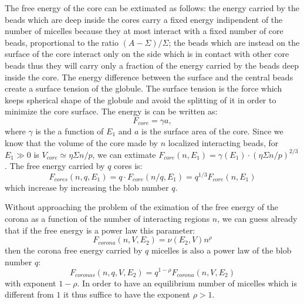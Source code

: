 \documentclass[12pt,a4paper,notitlepage]{article}
\begin{document}
The free energy of the core can be extimated as follows:
the energy carried by the beads which are deep inside the cores
carry a fixed energy indipendent of the number of micelles because
they at most interact with a fixed number of core beads, proportional
to the ratio $(A - \Sigma)/\Sigma$; the beads which are instead on the
surface of the core interact only on the side which is in contact with
other core beads thus they will carry only a fraction of the energy
carried by the beads deep inside the core. The
energy difference between the surface and the central beads create a
surface tension of the globule. The surface tension is the force which
keeps spherical shape of the globule and avoid the splitting of it in
order to minimize the core surface. The energy is can be written
as\cite{israelachvili2011}:
\begin{equation}
F_{core} = \gamma a,
\end{equation}
where $\gamma$ is the a function of $E_1$ and $a$ is the surface area
of the core. Since we know that the volume of the core made by $n$
localized interacting beads, for $E_1 \gg 0$ is $V_{core} \simeq 
\eta \Sigma n / p$, we can extimate $F_{core}(n, E_1) = \gamma(E_1)\cdot(
\eta \Sigma n / p)^{2/3}$. The free energy carried by $q$ cores is:
\begin{equation}
F_{cores}(n, q, E_1) = q\cdot F_{core}(n/q, E_1) =
q^{1/3} F_{core}(n, E_1)
\end{equation}
which increase by increasing the blob number $q$.

Without approaching the problem of the eximation of the free energy of
the corona as a function of the number of interacting regions $n$, we
can guess already that if the free energy is a power law this
parameter:
\begin{equation}
F_{corona}(n, V, E_2) = \nu(E_2, V) n^{\rho}
\label{eq:coronapow}
\end{equation}
then the corona free energy carried by $q$ micelles is also a power
law of the blob number $q$:
\begin{equation}
F_{coronas}(n, q, V, E_2) = q^{1 - \rho} F_{corona}(n, V, E_2)
\end{equation}
with exponent $1 - \rho$. In order to have an equilibrium number of
micelles which is different from $1$ it thus suffice to have the
exponent $\rho > 1$.
\end{document}
